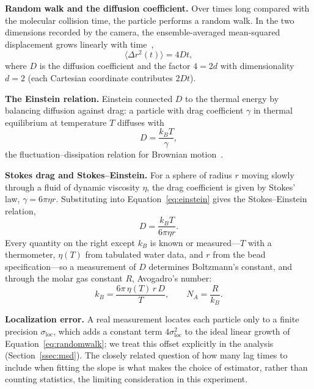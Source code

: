 \documentclass[11pt]{article}
\begin{document}
\textbf{Random walk and the diffusion coefficient.} Over times long compared with the
molecular collision time, the particle performs a random walk. In the two dimensions
recorded by the camera, the ensemble-averaged mean-squared displacement grows
linearly with time~\cite{qian},
\begin{equation}
    \langle \Delta r^2(t)\rangle = 4 D t,
    \label{eq:randomwalk}
\end{equation}
where $D$ is the diffusion coefficient and the factor $4 = 2d$ with dimensionality
$d = 2$ (each Cartesian coordinate contributes $2Dt$).

\textbf{The Einstein relation.} Einstein connected $D$ to the thermal energy by
balancing diffusion against drag: a particle with drag coefficient $\gamma$ in
thermal equilibrium at temperature $T$ diffuses with
\begin{equation}
    D = \frac{k_B T}{\gamma},
    \label{eq:einstein}
\end{equation}
the fluctuation--dissipation relation for Brownian motion~\cite{reif}.

\textbf{Stokes drag and Stokes--Einstein.} For a sphere of radius $r$ moving slowly
through a fluid of dynamic viscosity $\eta$, the drag coefficient is given by Stokes'
law, $\gamma = 6\pi\eta r$. Substituting into Equation~\eqref{eq:einstein} gives the
Stokes--Einstein relation,
\begin{equation}
    D = \frac{k_B T}{6\pi\eta r}.
    \label{eq:se}
\end{equation}
Every quantity on the right except $k_B$ is known or measured---$T$ with a
thermometer, $\eta(T)$ from tabulated water data, and $r$ from the bead
specification---so a measurement of $D$ determines Boltzmann's constant, and through
the molar gas constant $R$, Avogadro's number:
\begin{equation}
    k_B = \frac{6\pi\,\eta(T)\,r\,D}{T},
    \qquad
    N_A = \frac{R}{k_B}.
    \label{eq:kbtheory}
\end{equation}

\textbf{Localization error.} A real measurement locates each particle only to a
finite precision $\sigma_{\text{loc}}$, which adds a constant term $4\sigma_{\text{loc}}^2$
to the ideal linear growth of Equation~\eqref{eq:randomwalk}; we treat this offset
explicitly in the analysis (Section~\ref{ssec:msd}). The closely related question of
how many lag times to include when fitting the slope is what makes the choice of
estimator, rather than counting statistics, the limiting consideration in this
experiment.
\end{document}
